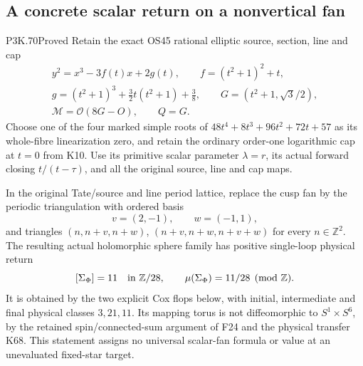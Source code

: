 \subsection{A concrete scalar return on a nonvertical fan}
\begin{statement}{P3K.70}{Proved}
Retain the exact OS45 rational elliptic source, section, line and cap
\[
\begin{gathered}
y^2=x^3-3f(t)x+2g(t),\qquad
f=(t^2+1)^2+t,\\
g=(t^2+1)^3+\tfrac32t(t^2+1)+\tfrac38,\qquad
G=(t^2+1,\sqrt3/2),\\
\mathcal M=\mathcal O(8G-O),\qquad Q=G.
\end{gathered}
\]
Choose one of the four marked simple roots of
\(48t^4+8t^3+96t^2+72t+57\) as its whole-fibre linearization zero,
and retain the ordinary order-one logarithmic cap at \(t=0\) from
K10. Use its primitive scalar parameter \(\lambda=r\), its actual
forward closing \(t/(t-\tau)\), and all the original source, line
and cap maps.

In the original Tate/source and line period lattice, replace the cusp
fan by the periodic triangulation with ordered basis
\[
 v=(2,-1),\qquad w=(-1,1),
\]
and triangles \((n,n+v,n+w)\),
\((n+v,n+w,n+v+w)\) for every \(n\in\mathbb Z^2\).
The resulting actual holomorphic sphere family has positive
single-loop physical return
\[
 [\Sigma_\Phi]=11\quad\hbox{in }\mathbb Z/28,
 \qquad \mu(\Sigma_\Phi)=11/28\pmod{\mathbb Z}.
\]
It is obtained by the two explicit Cox flops below, with initial,
intermediate and final physical classes \(3,21,11\). Its mapping
torus is not diffeomorphic to \(S^1\times S^6\), by the retained
spin/connected-sum argument of F24 and the physical transfer K68.
This statement assigns no universal scalar-fan formula or value at
an unevaluated fixed-star target.
\end{statement}
